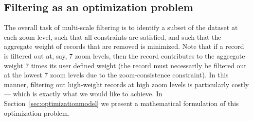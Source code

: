 

\subsection{Filtering as an optimization problem}
\label{sec:filtering}

The overall task of multi-scale filtering is to identify a subset of the dataset at each zoom-level, such that all constraints are satisfied, and such that the aggregate weight of records that are removed is minimized. Note that if a record is filtered out at, say, 7 zoom levels, then the record contributes to the aggregate weight 7 times its user defined weight (the record must necessarily be filtered out at the lowest 7 zoom levels due to the zoom-consistence constraint). In this manner, filtering out high-weight records at high zoom levels is particularly costly --- which is exactly what we would like to achieve. In Section~\ref{sec:optimizationmodel} we present a mathematical formulation of this optimization problem.




